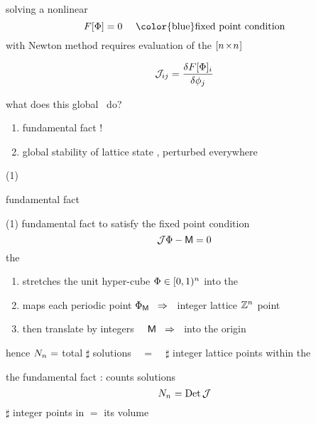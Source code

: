 \begin{frame}{\jacobianOrb}
solving a nonlinear
\[
F[\Xx]=0 \quad \mbox{ \color{blue}fixed point condition}
\]
with Newton method requires evaluation of
the $[{n_{}}\!\times\!{n_{}}]$
    \begin{block}{\jacobianOrb}
\[
{\cal J}_{ij} =\frac{\delta F[\Phi]_i}{\delta \phi_j}
\] %
    \end{block}

what does this global \jacobianOrb\ do?
\bigskip

\begin{enumerate}
              \item
fundamental fact {\color{red}!}
              \item
global stability of lattice state \Xx, perturbed everywhere
            \end{enumerate}
\end{frame} %

\begin{frame}{(1)}
\vfill
\begin{center}
{\huge fundamental fact}
\end{center}
\vfill
\end{frame} %

\begin{frame}{(1) fundamental fact}
to satisfy the fixed point condition
\[
{\cal J}\Phi-\mathsf{M} = 0
\]
the
 {\jacobianOrb} \jMorb\
\begin{enumerate}
              \item
stretches the unit hyper-cube $\Phi\in[0,1)^{n_{}}$ into the \cl{}\dmn\
{\color{blue}\fundPip}
              \item
maps each periodic point ${\Phi}_{\mathsf{M}}\;\;\Rightarrow\;\;$ integer lattice
$\mathbb{Z}^{n_{}}$ point
              \item
then translate by integers ~~$\mathsf{M}\;\;\Rightarrow\;\;$ into the origin
            \end{enumerate}
hence $N_{n_{}} =$ total $\sharp$ solutions ~~=~~ $\sharp$
integer lattice points within the {\fundPip}

\bigskip

the {\color{blue}fundamental fact} :
{\color{blue}\HillDet} counts solutions
\[
N_{n_{}} = \mbox{\rm Det}\,{\cal J}
\] %
$\sharp$ integer points in {\fundPip} $=$ its volume
\end{frame} %


